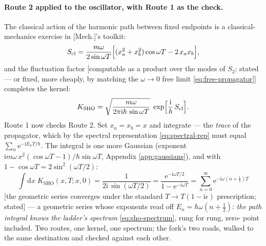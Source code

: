 \documentclass[11pt]{article}
\theoremstyle{plain}
\theoremstyle{definition}
\theoremstyle{remark}
\newcommand{\dd}{\mathrm{d}}
\newcommand{\ee}{\mathrm{e}}
\newcommand{\ii}{\mathrm{i}}
\begin{document}
\paragraph{Route 2 applied to the oscillator, with Route 1 as the check.} The
classical action of the harmonic path between fixed endpoints is a
classical-mechanics exercise in [Mech.]'s toolkit:
\begin{equation}
  S_{\text{cl}}
  = \frac{m\omega}{2\sin\omega T}
    \Bigl[
      (x_a^2 + x_b^2)\cos\omega T - 2\,x_a x_b
    \Bigr],
\end{equation}
and the fluctuation factor [computable as a product over the modes
of $S_2$; stated --- or fixed, more cheaply, by matching the
$\omega \to 0$ free limit \eqref{eq:free-propagator}] completes the
kernel:
\begin{equation}
  K_{\text{SHO}}
  = \sqrt{\frac{m\omega}{2\pi\ii\hbar\,\sin\omega T}}\;
    \exp\Bigl[\frac{\ii}{\hbar}\,S_{\text{cl}}\Bigr].
  \label{eq:mehler}
\end{equation}
Route 1 now checks Route 2. Set $x_a = x_b = x$ and integrate ---
the \emph{trace} of the propagator, which by the spectral
representation \eqref{eq:spectral-rep} must equal
$\sum_n \ee^{-\ii E_n T/\hbar}$. The integral is one more Gaussian
(exponent
$\ii m\omega\,x^2(\cos\omega T - 1)/\hbar\sin\omega T$, Appendix
\ref{app:gaussians}), and with $1 - \cos\omega T =
2\sin^2(\omega T/2)$:
\begin{equation}
  \int\dd x\; K_{\text{SHO}}(x, T; x, 0)
  = \frac{1}{2\ii\,\sin(\omega T/2)}
  = \frac{\ee^{-\ii\omega T/2}}{1 - \ee^{-\ii\omega T}}
  = \sum_{n=0}^{\infty}
    \ee^{-\ii\omega\left(n + \frac12\right) T}
  \label{eq:trace-check}
\end{equation}
[the geometric series converges under the standard
$T \to T(1 - \ii\epsilon)$ prescription; stated]
--- a geometric series whose exponents read off
$E_n = \hbar\omega(n + \tfrac12)$: \emph{the path integral knows the
ladder's spectrum} \eqref{eq:sho-spectrum}, rung for rung, zero-%
point included. Two routes, one kernel, one spectrum; the fork's two
roads, walked to the same destination and checked against each
other.
\end{document}
